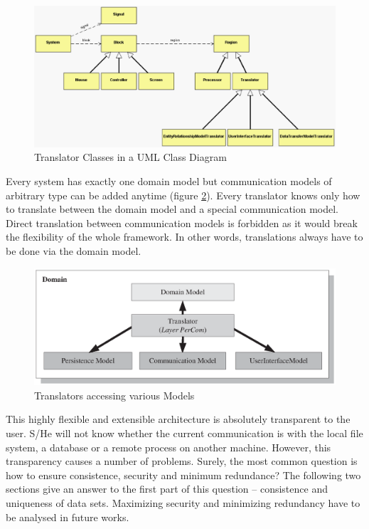 \begin{figure}[ht]
    \begin{center}
       \includegraphics[scale=0.24]{images/class_diagram.eps}
       \caption{Translator Classes in a UML Class Diagram}
       \label{translator_classes_figure}
    \end{center}
\end{figure}

Every system has exactly one domain model but communication models of arbitrary
type can be added anytime (figure \ref{translators_figure}). Every translator knows
only how to translate between the domain model and a special communication model.
Direct translation between communication models is forbidden as it would break the
flexibility of the whole framework. In other words, translations always have to be
done via the domain model.

\begin{figure}[ht]
    \begin{center}
       \includegraphics[scale=0.4]{images/layer_percom.eps}
       \caption{Translators accessing various Models}
       \label{translators_figure}
    \end{center}
\end{figure}

This highly flexible and extensible architecture is absolutely transparent to
the user. S/He will not know whether the current communication is with the local
file system, a database or a remote process on another machine. However, this
transparency causes a number of problems. Surely, the most common question is
how to ensure consistence, security and minimum redundance? The following two
sections give an answer to the first part of this question -- consistence and
uniqueness of data sets. Maximizing security and minimizing redundancy have to
be analysed in future works.

